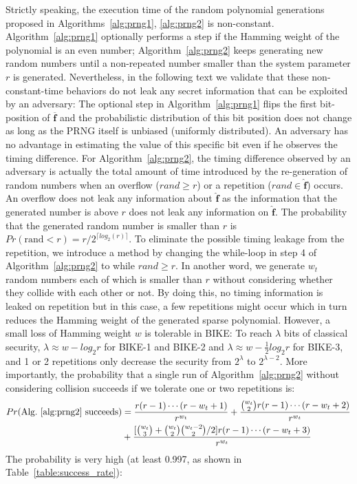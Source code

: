 \documentclass[runningheads]{llncs}
\begin{document}
Strictly speaking, the execution time of the random polynomial generations proposed in
Algorithms~\ref{alg:prng1}, \ref{alg:prng2} is non-constant.
Algorithm~\ref{alg:prng1} optionally performs a step if the
Hamming weight of the polynomial is an even number;
Algorithm~\ref{alg:prng2} keeps generating new random numbers
until a non-repeated number smaller than the system parameter $r$
is generated.
Nevertheless, in the following text we validate that
these non-constant-time behaviors do not leak any secret
information that can be exploited by an adversary:
The optional step in Algorithm~\ref{alg:prng1}
flips the first bit-position of $\mathbf{\overline{f}}$
and the probabilistic distribution of this bit position
does not change as long as the PRNG itself is unbiased (uniformly distributed).
An adversary has no advantage in estimating the value
of this specific bit even if he observes the timing difference.
For Algorithm~\ref{alg:prng2}, the timing difference
observed by an adversary is actually the total amount
of time introduced by the re-generation of random numbers
when an overflow ($rand\geq r$) or a repetition ($rand\in \mathbf{\hat{f}}$) occurs.
An overflow does not leak any information about $\mathbf{\hat{f}}$
as the information that the generated number is above $r$ does
not leak any information on $\mathbf{\hat{f}}$.
The probability that the generated random number is smaller
than $r$ is $Pr(\text{rand} < r)= r/2^{\lceil log_2(r)\rceil}$.
To eliminate the possible timing leakage from the repetition,
we introduce a method by changing the while-loop
in step 4 of Algorithm~\ref{alg:prng2} to while $rand\geq r$.
In another word, we generate $w_t$ random numbers each
of which is smaller than $r$ without considering whether they collide
with each other or not.
By doing this, no timing information is leaked on repetition but
in this case, a few repetitions might occur which in turn reduces
the Hamming weight of the generated sparse polynomial.
However, a small loss of Hamming weight $w$ is tolerable in BIKE:
To reach $\lambda$ bits of classical security, $\lambda\approx w-log_2r$ for
BIKE-1 and BIKE-2 and $\lambda\approx w-\frac{1}{2}log_2r$ for BIKE-3,
and 1 or 2 repetitions only decrease the security from $2^\lambda$ to $2^{\lambda-2}$.
More importantly, the probability that a single run of Algorithm~\ref{alg:prng2} without considering collision succeeds if we tolerate one or two repetitions is:
\begin{align}
    Pr(\text{Alg.~\ref{alg:prng2} succeeds})
    &=\frac{r(r-1)\cdots (r-w_t+1)}{r^{w_t}}+ \frac{\binom{w_t}{2}r(r-1)\cdots (r-w_t+2)}{r^{w_t}}\\
    &+ \frac{[\binom{w_t}{3}+\binom{w_t}{2}\binom{w_t-2}{2}/2]  r(r-1)\cdots (r-w_t+3) }{r^{w_t}}
\end{align}
The probability is very high (at least 0.997, as shown in Table~\ref{table:success_rate}):
\end{document}
